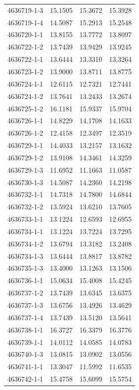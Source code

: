 \begin{longtable}{lrrr}
4636719-1-3 & 15.1505 & 15.3672 & 15.3928 \\
4636719-1-4 & 14.5087 & 15.2913 & 15.2548 \\
4636720-1-1 & 13.8155 & 13.7772 & 13.8097 \\
4636722-1-2 & 13.7439 & 13.9429 & 13.9245 \\
4636722-1-1 & 13.6444 & 13.3310 & 13.3264 \\
4636723-1-2 & 13.9000 & 13.8711 & 13.8775 \\
4636724-1-1 & 12.6115 & 12.7321 & 12.7441 \\
4636724-1-2 & 13.7641 & 13.2433 & 13.2674 \\
4636725-1-2 & 16.1181 & 15.9337 & 15.9704 \\
4636726-1-1 & 14.8229 & 14.1708 & 14.1633 \\
4636726-1-2 & 12.4158 & 12.3497 & 12.3519 \\
4636729-1-1 & 14.4033 & 13.2157 & 13.1632 \\
4636729-1-2 & 13.9108 & 14.3461 & 14.3259 \\
4636729-1-3 & 11.6952 & 11.1663 & 11.0587 \\
4636730-1-3 & 14.5087 & 14.2360 & 14.2198 \\
4636732-1-1 & 14.7318 & 14.7800 & 14.6844 \\
4636732-1-2 & 13.5924 & 13.6210 & 13.7605 \\
4636733-1-1 & 13.1224 & 12.6593 & 12.6955 \\
4636734-1-1 & 13.1224 & 13.7224 & 13.7295 \\
4636734-1-2 & 13.6794 & 13.3182 & 13.2408 \\
4636734-1-3 & 13.6444 & 13.8817 & 13.8782 \\
4636735-1-3 & 13.4000 & 13.1263 & 13.1506 \\
4636736-1-1 & 15.0634 & 15.4008 & 15.4245 \\
4636737-1-2 & 13.7439 & 13.6345 & 13.6375 \\
4636737-1-3 & 13.6756 & 13.4926 & 13.4629 \\
4636737-1-4 & 13.7439 & 13.5120 & 13.5641 \\
4636738-1-1 & 16.3727 & 16.3379 & 16.3776 \\
4636739-1-1 & 14.0112 & 14.0585 & 14.0783 \\
4636740-1-3 & 13.0815 & 13.0902 & 13.0556 \\
4636741-1-1 & 13.3047 & 11.5992 & 11.6535 \\
4636742-1-1 & 15.4758 & 15.6099 & 15.5754 \\

\end{longtable}
